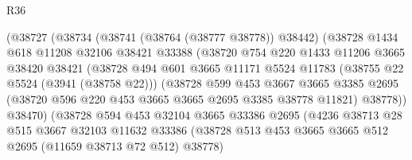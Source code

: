 \begin{lexlean}{R36}
\begin{coremodule}
                          (@38727
                            (@38734
                              (@38741 (@38764 (@38777 @38778)) @38442)
                              (@38728
                                @1434
                                @618
                                @11208
                                @32106
                                @38421
                                @33388
                                (@38720
                                  @754
                                  @220
                                  @1433
                                  @11206
                                  @3665
                                  @38420
                                  @38421
                                  (@38728
                                    @494
                                    @601
                                    @3665
                                    @11171
                                    @5524
                                    @11783
                                    (@38755 @22 @5524 (@3941 (@38758 @22)))
                                    (@38728
                                      @599
                                      @453
                                      @3667
                                      @3665
                                      @3385
                                      @2695
                                      (@38720 @596 @220 @453 @3665 @3665 @2695 @3385 @38778 @11821)
                                      @38778))
                                  @38470)
                                (@38728
                                  @594
                                  @453
                                  @32104
                                  @3665
                                  @33386
                                  @2695
                                  (@4236
                                    @38713
                                    @28
                                    @515
                                    @3667
                                    @32103
                                    @11632
                                    @33386
                                    (@38728
                                      @513
                                      @453
                                      @3665
                                      @3665
                                      @512
                                      @2695
                                      (@11659 @38713 @72 @512)
                                      @38778)

\end{coremodule}
\end{lexlean}

